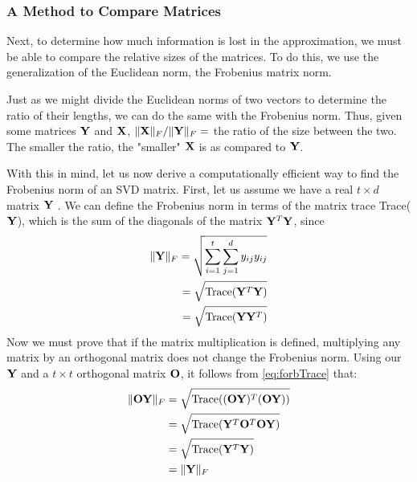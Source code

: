  \subsubsection{A Method to Compare Matrices}
Next, to determine how much information is lost in the approximation, we must be able to compare the relative sizes of the matrices. To do this, we use the generalization of the Euclidean norm, the Frobenius matrix norm.

Just as we might divide the Euclidean norms of two vectors to determine the ratio of their lengths, we can do the same with the Frobenius norm. Thus, given some matrices $\mathbf{Y}$ and $\mathbf{X}$, $\|\mathbf{X}\|_F / \|\mathbf{Y}\|_F =$ the ratio of the size between the two. The smaller the ratio, the "smaller"
$\mathbf{X}$ is as compared to $\mathbf{Y}$.

 
 With this in mind, let us now derive a computationally efficient way to find the Frobenius norm of an SVD matrix.
 First, let us assume we have a real $t \times d$ matrix $\mathbf{Y}$ . We can define the Frobenius norm in terms of the matrix trace Trace($\mathbf{Y}$), which is the sum of the diagonals of the matrix $\mathbf{Y}^T\mathbf{Y}$, since
\begin{equation} \label{eq:forbTrace}
\begin{aligned}
     \|\mathbf{Y}\|_F = \sqrt{\sum_{i=1}^t \sum_{j=1}^d  y_{ij}y_{ij}} \\
                    = \sqrt{\text{Trace}(\mathbf{Y}^T\mathbf{Y})} \\
                    = \sqrt{\text{Trace}(\mathbf{Y}\mathbf{Y}^T)}
\end{aligned}
\end{equation}
Now we must prove that if the matrix multiplication is defined, multiplying any matrix by an orthogonal matrix does not change the Frobenius norm. Using our $\mathbf{Y}$ and a $t \times t$ orthogonal matrix $\mathbf{O}$, it follows from \autoref{eq:forbTrace} that:
\begin{equation} \label{eq:froboOrtho1}
\begin{aligned}
    \|\mathbf{O}\mathbf{Y}\|_F &= \sqrt{\text{Trace}((\mathbf{O}\mathbf{Y})^T(\mathbf{O}\mathbf{Y}))}   \\
            &= \sqrt{\text{Trace}(\mathbf{Y}^T\mathbf{O}^T\mathbf{O}\mathbf{Y})} \\ 
            &=  \sqrt{\text{Trace}(\mathbf{Y}^T\mathbf{Y})}  \\
            &=  \|\mathbf{Y}\|_F 
\end{aligned}
\end{equation}
